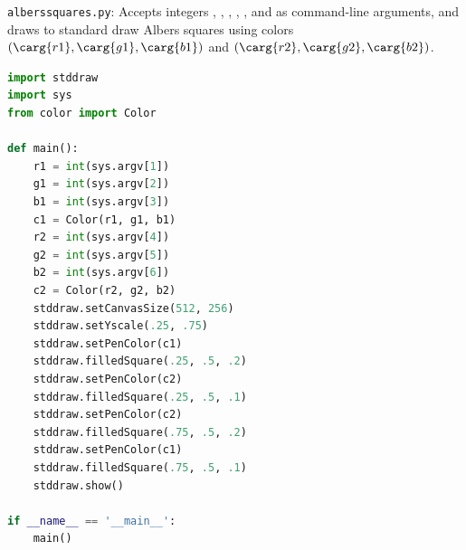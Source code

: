 \documentclass[8pt,a4paper,compress,handout]{beamer}
\begin{document}
\begin{frame}[fragile]
\begin{framed}
\tiny \lstinline{alberssquares.py}: Accepts integers , , , , , and  as command-line arguments, and draws to standard draw Albers squares using colors $(\carg{r1}, \carg{g1}, \carg{b1})$ and $(\carg{r2}, \carg{g2}, \carg{b2})$.
\end{framed}

\begin{lstlisting}[language=Python]
import stddraw
import sys
from color import Color

def main():
    r1 = int(sys.argv[1])
    g1 = int(sys.argv[2])
    b1 = int(sys.argv[3])
    c1 = Color(r1, g1, b1)
    r2 = int(sys.argv[4])
    g2 = int(sys.argv[5])
    b2 = int(sys.argv[6])
    c2 = Color(r2, g2, b2)
    stddraw.setCanvasSize(512, 256)
    stddraw.setYscale(.25, .75)
    stddraw.setPenColor(c1)
    stddraw.filledSquare(.25, .5, .2)
    stddraw.setPenColor(c2)
    stddraw.filledSquare(.25, .5, .1)
    stddraw.setPenColor(c2)
    stddraw.filledSquare(.75, .5, .2)
    stddraw.setPenColor(c1)
    stddraw.filledSquare(.75, .5, .1)
    stddraw.show()

if __name__ == '__main__':
    main()
\end{lstlisting}
\end{frame}
\end{document}
